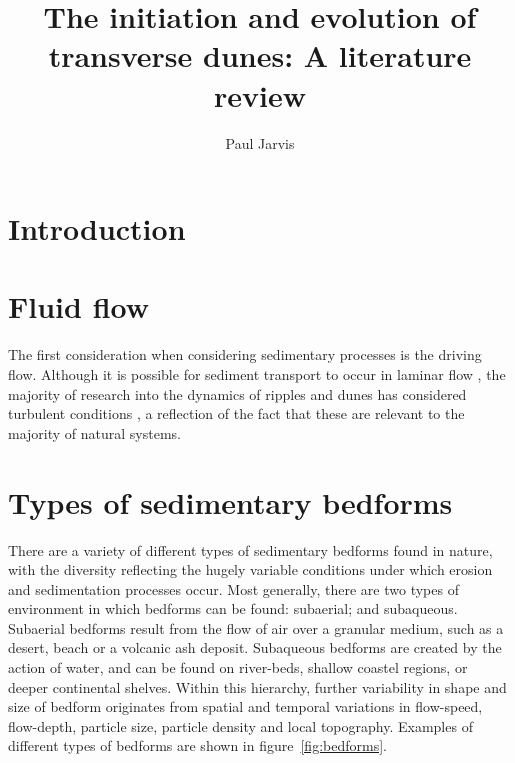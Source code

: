 \documentclass[12pt]{article}
\title{The initiation and evolution of transverse dunes: A literature review}
\date{}
\author{Paul Jarvis}
\begin{document}
\thispagestyle{empty}

\maketitle

\section{Introduction}
\label{sec:intro}

\section{Fluid flow}
\label{sec:fluid}

The first consideration when considering sedimentary processes is the driving flow. Although it is possible for sediment transport to occur in laminar flow \citep{Charru02, Charru04, Mouilleron09}, the majority of research into the dynamics of ripples and dunes has considered turbulent conditions \citep{Andreotti02, Kroy02, Langlois07, Wierschem08, Franklin11, Charru12, Andreotti12, Franklin15}, a reflection of the fact that these are relevant to the majority of natural systems.

\section{Types of sedimentary bedforms}
\label{sec:sed_bed}

There are a variety of different types of sedimentary bedforms found in nature, with the diversity reflecting the hugely variable conditions under which erosion and sedimentation processes occur. Most generally, there are two types of environment in which bedforms can be found: subaerial; and subaqueous. Subaerial bedforms result from the flow of air over a granular medium, such as a desert, beach or a volcanic ash deposit. Subaqueous bedforms are created by the action of water, and can be found on river-beds, shallow coastel regions, or deeper continental shelves. Within this hierarchy, further variability in shape and size of bedform originates from spatial and temporal variations in flow-speed, flow-depth, particle size, particle density and local topography. Examples of different types of bedforms are shown in figure~\ref{fig:bedforms}.
\end{document}
